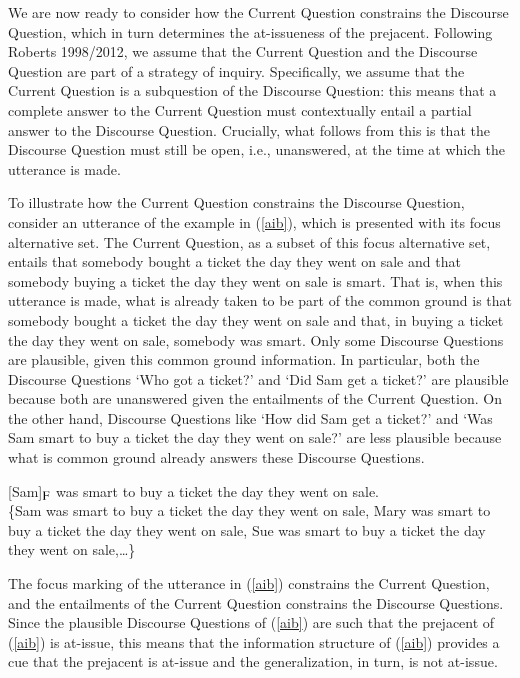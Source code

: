 \documentclass[11pt,fleqn]{article}
\newcommand{\foc}{$_{\mbox{\small F}}$}
\newcommand{\6}{\mbox{$[\hspace*{-.6mm}[$}}
\newcommand{\9}{\mbox{$]\hspace*{-.6mm}]$}}
\begin{document}
We are now ready to consider how the Current Question constrains the Discourse Question, which in turn determines the at-issueness of the prejacent.  Following Roberts 1998/2012\nocite{roberts98,roberts12}, we assume that the Current Question and the Discourse Question are part of a strategy of inquiry. Specifically, we assume that the Current Question is a subquestion of the Discourse Question: this means that a complete answer to the Current Question must contextually entail a partial answer to the Discourse Question. Crucially, what follows from this is that the Discourse Question must still be open, i.e., unanswered, at the time at which the utterance is made. 

To illustrate how the Current Question constrains the Discourse Question, consider an utterance of the example in (\ref{aib}), which is presented with its focus alternative set. The Current Question, as a subset of this focus alternative set, entails that somebody bought a ticket the day they went on sale and that somebody buying a ticket the day they went on sale is smart. That is, when this utterance is made, what is already taken to be part of the common ground is that somebody bought a ticket the day they went on sale and that, in buying a ticket the day they went on sale, somebody was smart. Only some Discourse Questions are plausible, given this common ground information. In particular, both the Discourse Questions `Who got a ticket?' and `Did Sam get a ticket?' are plausible because both are unanswered given the entailments of the Current Question. On the other hand, Discourse Questions like `How did Sam get a ticket?' and `Was Sam smart to buy a ticket the day they went on sale?' are less plausible because what is common ground already answers these Discourse Questions.

\begin{exe}
\ex\label{aib} {[}Sam]\foc{} was smart to buy a ticket the day they went on sale.
\\ \{Sam was smart to buy a ticket the day they went on sale, Mary was smart to buy a ticket the day they went on sale, Sue was smart to buy a ticket the day they went on sale,\ldots\}
\end{exe}
The focus marking of the utterance in (\ref{aib}) constrains the Current Question, and the entailments of the Current Question constrains the Discourse Questions. Since the plausible Discourse Questions of (\ref{aib}) are such that the prejacent of (\ref{aib}) is at-issue, this means that the information structure of (\ref{aib}) provides a cue that the prejacent is at-issue and the generalization, in turn, is not at-issue.
\end{document}
